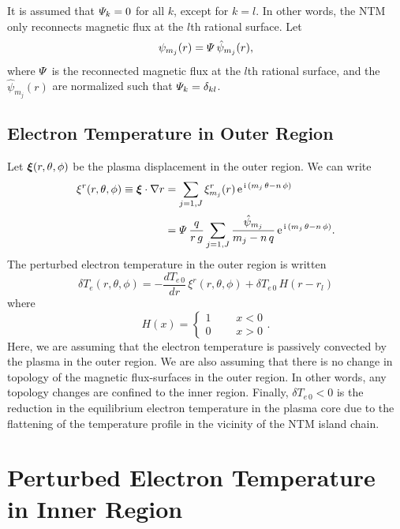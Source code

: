 \documentclass[12pt,prb,aps]{revtex4-1}
\newcommand {\bxi}{\mbox{\boldmath$\xi$}}
\begin{document}
 It is assumed that ${\mit\Psi}_k = 0$ for all $k$, except for $k=l$. In other words, the NTM only reconnects magnetic flux at the
$l$th rational surface. Let 
\begin{equation}
\psi_{m_j}(r) = {\mit\Psi}\,\hat{\psi}_{m_j}(r),
\end{equation}
where ${\mit\Psi}$ is the reconnected magnetic flux at the $l$th rational surface, and the $\hat{\psi}_{m_j}(r)$ are normalized such that ${\mit\Psi}_k
= \delta_{kl}$. 

\subsection{Electron Temperature in Outer Region}
Let $\bxi(r,\theta,\phi)$ be the plasma displacement in the outer region. We can write\,\cite{tear10}
\begin{align}\label{xi}
\xi^r(r,\theta,\phi)\equiv \bxi\cdot\nabla r& = \sum_{j=1,J}\xi_{m_j}^r(r)\,{\rm e}^{\,{\rm i}\,(m_j\,\theta-n\,\phi)}\nonumber\\[0.5ex]
&=
{\mit\Psi}\,\frac{q}{r\,g}\sum_{j=1,J}\frac{\hat{\psi}_{m_j}}{m_j-n\,q}\, {\rm e}^{\,{\rm i}\,(m_j\,\theta-n\,\phi)}.
\end{align}
The perturbed electron temperature  in the outer region is written
\begin{equation}
\delta T_e(r,\theta,\phi)= -\frac{dT_{e\,0}}{dr}\, \xi^r(r,\theta,\phi) + \delta T_{e\,0}\,H(r-r_{l})
\end{equation}
where
\begin{equation}
H(x)= \left\{\begin{array}{ccc}1&~~~&x<0\\0&&x>0\end{array}\right..
\end{equation}
Here, we are assuming that the electron temperature is passively convected by the plasma in the outer region. We are also
assuming that there is no change in topology of the magnetic flux-surfaces in the outer region. In other words, any topology changes are
confined to  the inner region. Finally, $\delta T_{e\,0}<0$ is the reduction in the equilibrium electron temperature in the plasma
core due to the flattening of the temperature profile in the vicinity of the NTM island chain.\cite{chang}

\section{Perturbed Electron Temperature  in Inner Region}\label{s4}
\end{document}
